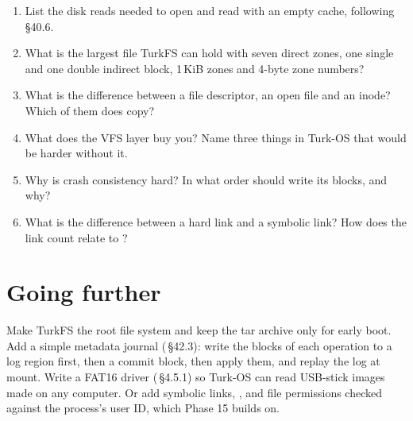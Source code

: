 \documentclass[11pt,a4paper]{article}
\begin{document}
\begin{questionbox}
\begin{enumerate}
  \item List the disk reads needed to open and read  with an empty cache, following \OSTEP\,\S40.6.
  \item What is the largest file TurkFS can hold with seven direct zones, one single and one double indirect block, 1\,KiB zones and 4-byte zone numbers?
  \item What is the difference between a file descriptor, an open file and an inode? Which of them does  copy?
  \item What does the VFS layer buy you? Name three things in Turk-OS that would be harder without it.
  \item Why is crash consistency hard? In what order should  write its blocks, and why?
  \item What is the difference between a hard link and a symbolic link? How does the link count relate to ?
\end{enumerate}
\end{questionbox}

\section{Going further}

Make TurkFS the root file system and keep the tar archive only for early boot. Add a simple metadata journal
(\OSTEP\,\S42.3): write the blocks of each operation to a log region first, then a commit block, then apply them, and
replay the log at mount. Write a FAT16 driver (\MOS\,\S4.5.1) so Turk-OS can read USB-stick images made on any
computer. Or add symbolic links, , and file permissions checked against the process's user ID, which
Phase 15 builds on.

\booklegend
\end{document}
